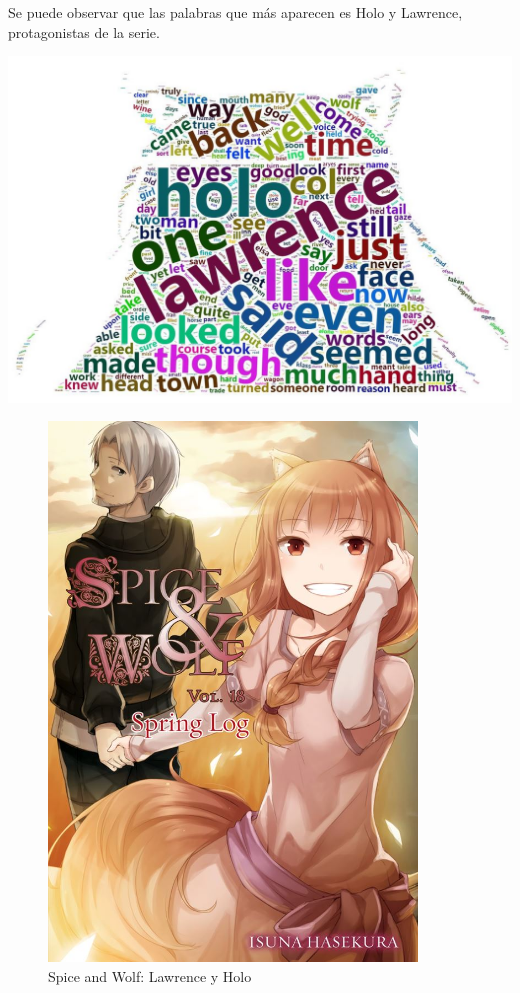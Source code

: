 \documentclass[
]{article}
\begin{document}
Se puede observar que las palabras que más aparecen es Holo y Lawrence,
protagonistas de la serie.

\includegraphics{descarga2.jpg}

\begin{figure}
\centering
\includegraphics[width=3.85417in,height=\textheight]{Capturaholo.jpg}
\caption{Spice and Wolf: Lawrence y Holo}
\end{figure}
\end{document}

